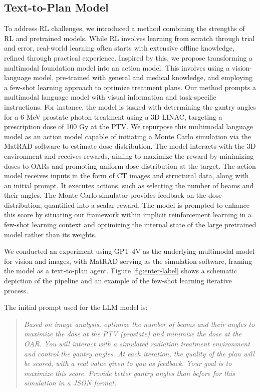 \documentclass[runningheads]{llncs}
\begin{document}
\subsection{Text-to-Plan Model}

To address RL challenges, we introduced a method combining the strengths of RL and pretrained models. While RL involves learning from scratch through trial and error, real-world learning often starts with extensive offline knowledge, refined through practical experience. Inspired by this, we propose transforming a multimodal foundation model into an action model. This involves using a vision-language model, pre-trained with general and medical knowledge, and employing a few-shot learning approach to optimize treatment plans. Our method prompts a multimodal language model with visual information and task-specific instructions. For instance, the model is tasked with determining the gantry angles for a 6 MeV prostate photon treatment using a 3D LINAC, targeting a prescription dose of 100 Gy at the PTV. We repurpose this multimodal language model as an action model capable of initiating a Monte Carlo simulation via the MatRAD software to estimate dose distribution. The model interacts with the 3D environment and receives rewards, aiming to maximize the reward by minimizing doses to OARs and promoting uniform dose distribution at the target. The action model receives inputs in the form of CT images and structural data, along with an initial prompt. It executes actions, such as selecting the number of beams and their angles. The Monte Carlo simulator provides feedback on the dose distribution, quantified into a scalar reward. The model is prompted to enhance this score by situating our framework within implicit reinforcement learning in a few-shot learning context and optimizing the internal state of the large pretrained model rather than its weights.

We conducted an experiment using GPT-4V \cite{openai2024gpt4} as the underlying multimodal model for vision and images, with MatRAD serving as the simulation software, framing the model as a text-to-plan agent. Figure \ref{fig:enter-label} shows a schematic depiction of the pipeline and an example of the few-shot learning iterative process.

The initial prompt used for the LLM model is:
\begin{quote}
\textit{
Based on image analysis, optimize the number of beams and their angles to maximize the dose at the PTV (prostate) and minimize the dose at the OAR. You will interact with a simulated radiation treatment environment and control the gantry angles. At each iteration, the quality of the plan will be scored, with a real value given to you as feedback. Your goal is to maximize this score. Provide better gantry angles than before for this simulation in a JSON format.}
\end{quote}
\end{document}
